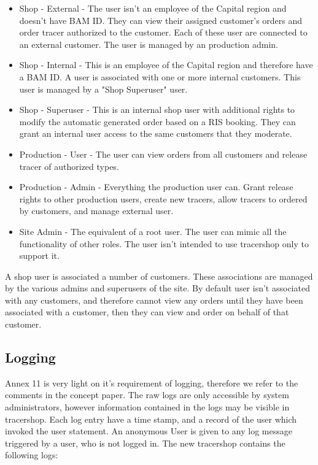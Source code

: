 \documentclass{article}
\begin{document}
\begin{itemize}
  \item Shop - External - The user isn't an employee of the Capital region and doesn't have BAM ID. They can view their assigned customer's orders and order tracer authorized to the customer.
  Each of these user are connected to an external customer. The user is managed by an production admin.
  \item Shop - Internal - This is an employee of the Capital region and therefore have a BAM ID. A user is associated with one or more internal customers. This user is managed by a "Shop Superuser" user.
  \item Shop - Superuser - This is an internal shop user with additional rights to modify the automatic generated order based on a RIS booking.
  They can grant an internal user access to the same customers that they moderate.
  \item Production - User - The user can view orders from all customers and release tracer of authorized types.
  \item Production - Admin - Everything the production user can. Grant release rights to other production users, create new tracers, allow tracers to ordered by customers, and manage external user.
  \item Site Admin - The equivalent of a root user. The user can mimic all the functionality of other roles. The user isn't intended to use tracershop only to support it.
\end{itemize}

A shop user is associated a number of customers. These associations are managed by the various admins and superusers of the site. By default user isn't associated with any customers, and therefore cannot view any orders until they have been associated with a customer, then they can view and order on behalf of that customer.

\subsection*{Logging}
Annex 11 is very light on it's requirement of logging, therefore we refer to the comments in the concept paper. The raw logs are only accessible by system administrators, however information contained in the logs may be visible in tracershop. Each log entry have a time stamp, and a record of the user which invoked the user statement. An anonymous User is given to any log message triggered by a user, who is not logged in.
The new tracershop contains the following logs:
\end{document}
